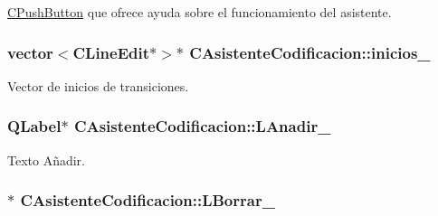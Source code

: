 \hyperlink{classCPushButton}{C\+Push\+Button} que ofrece ayuda sobre el funcionamiento del asistente. 

\subsubsection[{\texorpdfstring{inicios\+\_\+}{inicios_}}]{\setlength{\rightskip}{0pt plus 5cm}vector$<${\bf C\+Line\+Edit}$\ast$$>$$\ast$ C\+Asistente\+Codificacion\+::inicios\+\_\+\hspace{0.3cm}{\ttfamily [private]}}\hypertarget{classCAsistenteCodificacion_ac0ac600fe894126b5273249b1748a267}{}\label{classCAsistenteCodificacion_ac0ac600fe894126b5273249b1748a267}


Vector de inicios de transiciones. 

\subsubsection[{\texorpdfstring{L\+Anadir\+\_\+}{LAnadir_}}]{\setlength{\rightskip}{0pt plus 5cm}Q\+Label$\ast$ C\+Asistente\+Codificacion\+::\+L\+Anadir\+\_\+\hspace{0.3cm}{\ttfamily [private]}}\hypertarget{classCAsistenteCodificacion_acd2847b7726990965a4e5aa5d5278805}{}\label{classCAsistenteCodificacion_acd2847b7726990965a4e5aa5d5278805}


Texto Añadir. 

\subsubsection[{\texorpdfstring{L\+Borrar\+\_\+}{LBorrar_}}]{$\ast$ C\+Asistente\+Codificacion\+::\+L\+Borrar\+\_\+\hspace{0.3cm}{\ttfamily [private]}}\hypertarget{classCAsistenteCodificacion_a2820e2c5c034ae5641b3c0a927921be9}{}\label{classCAsistenteCodificacion_a2820e2c5c034ae5641b3c0a927921be9}


